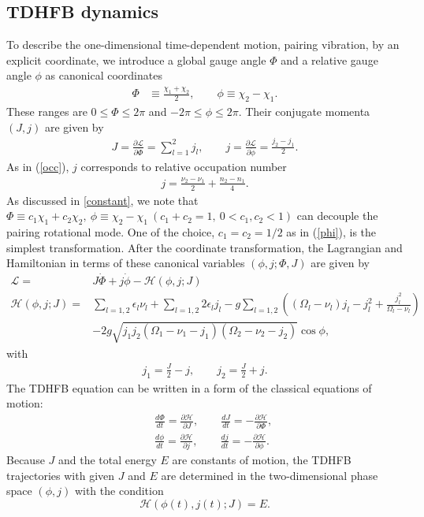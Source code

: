 \documentclass[11pt]{book} %
\begin{document}
\subsection{TDHFB dynamics}
To describe the one-dimensional time-dependent motion, pairing vibration, by an explicit coordinate, we introduce a global gauge angle $\Phi$ and a relative gauge angle $\phi$ as canonical coordinates
\begin{align}
  \Phi &\equiv \frac{\chi_1 + \chi_2}{2}, \quad\quad
  \phi\equiv \chi_2 - \chi_1.
\label{phi}
\end{align}
These ranges are $0\leq \Phi \leq 2\pi$ and $-2\pi \leq \phi \leq 2\pi$. 
Their conjugate momenta $(J,j)$ are given by
\begin{align}
	J = \frac{\partial\mathcal{L}}{\partial\dot{\Phi}} =  \sum_{l=1}^2 j_l, 
 \quad\quad
j = \frac{\partial\mathcal{L}}{\partial\dot{\phi}} = \frac{j_2 - j_1}{2}.
	\label{pi}
\end{align}
As in (\ref{occ}), $j$ corresponds to relative occupation number
\begin{align}
  j = \frac{\nu_{2}-\nu_{1}}{2} + \frac{n_{2}-n_{1}}{4} .
\end{align}
As discussed in \ref{constant}, we note that $\Phi \equiv c_1\chi_1 + c_2\chi_2, \ \phi\equiv \chi_2 - \chi_1 \ (c_1+c_2=1,\ 0<c_1,c_2<1)$ can decouple the pairing rotational mode. One of the choice, $c_1=c_2=1/2$ as in (\ref{phi}), is the simplest transformation.
After the coordinate transformation, the Lagrangian and Hamiltonian in terms of these canonical variables
$(\phi,j;\Phi,J)$ are given by
\begin{align}
	\mathcal{L} =& J\dot{\Phi} + j\dot{\phi} - \mathcal{H}(\phi,j;J) \label{Lagrangian2}\\
	\mathcal{H}(\phi,j;J)
	=& \sum_{l=1,2} \epsilon_l\nu_l + \sum_{l=1,2} 2\epsilon_lj_l - g\sum_{l=1,2} \left( (\Omega_l-\nu_l) j_l - j_l^2 +\frac{j_l^2}{\Omega_l-\nu_l} \right) \nonumber \\
	&- 2g\sqrt{j_1j_2(\Omega_{1}-\nu_{1}-j_{1})(\Omega_{2}-\nu_{2}-j_{2})}\cos{\phi} , 
\label{Hamiltonian2}
\end{align}
with 
\begin{align}
	j_1 = \frac{J}{2} - j, \quad\quad j_2 = \frac{J}{2} + j .
	\label{j_l}
\end{align}
The TDHFB equation can be written in a form of
the classical equations of motion:
\begin{eqnarray}
	&&\frac{d\Phi}{dt} = \frac{\partial\mathcal{H}}{\partial J} ,\quad\quad
\frac{dJ}{dt} = -\frac{\partial\mathcal{H}}{\partial \Phi} , \\
	&&\frac{d\phi}{dt} = \frac{\partial\mathcal{H}}{\partial j} ,\quad\quad
\frac{dj}{dt} = -\frac{\partial\mathcal{H}}{\partial \phi} .
\label{TDHFB_equation}
\end{eqnarray}
Because $J$ and the total energy $E$ are constants of motion, the TDHFB trajectories with given $J$ and $E$ are determined
in the two-dimensional phase space $(\phi,j)$ with the condition
\begin{equation}
  \mathcal{H}(\phi(t),j(t);J) = E.
  \label{contour}
\end{equation}
\end{document}
